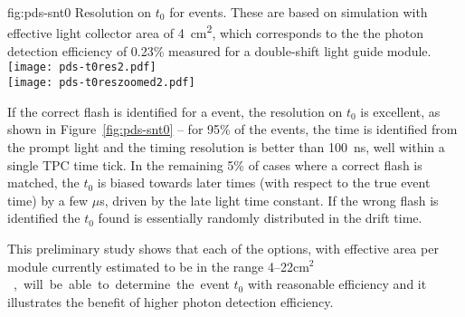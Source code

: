 \begin{dunefigure}{fig:pds-snt0}
{Resolution on $t_0$ for  events. These are based on simulation with effective light collector area of \SI{4}{cm^2}, which corresponds to the the photon detection efficiency of 0.23\% measured for a double-shift light guide module.}
  \texttt{[image: pds-t0res2.pdf]}\\
  \texttt{[image: pds-t0reszoomed2.pdf]}
\end{dunefigure}

If the correct flash is identified for a  event, the resolution on $t_0$ is excellent, as shown in Figure~\ref{fig:pds-snt0} -- for 95\% of the events, the time is identified from the prompt light and the timing resolution is better than \SI{100}{ns}, well within a single TPC time tick. In the remaining 5\% of cases where a correct flash is matched, the $t_0$ is biased towards later times (with respect to the true event time) by a few $\mu$s, driven by the late light time constant. If the wrong flash is identified the $t_0$ found is essentially randomly distributed in the drift time.

This preliminary study shows that each of the  options, with effective area per module currently estimated to be in the range  \numrange{4}{22}\si{cm$^2$}, will be able to determine the event $t_0$ with reasonable efficiency and it illustrates the benefit of higher photon detection efficiency. 



